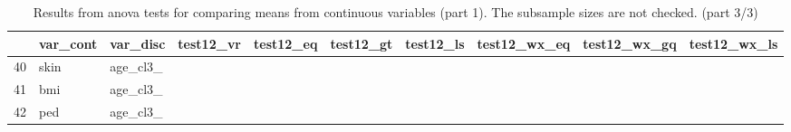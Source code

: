 \documentclass[12pt]{article}
\begin{document}
\begin{landscape}
\newpage
\begin{table}[ht]
\centering
\begin{tabular}{rlllllllll}
  \hline
 & var\_cont & var\_disc & test12\_vr & test12\_eq & test12\_gt & test12\_ls & test12\_wx\_eq & test12\_wx\_gq & test12\_wx\_ls \\ 
  \hline
40 & skin & age\_cl3\_ &   &   &   &   &   &   &   \\ 
  41 & bmi & age\_cl3\_ &   &   &   &   &   &   &   \\ 
  42 & ped & age\_cl3\_ &   &   &   &   &   &   &   \\ 
   \hline
\end{tabular}
\caption{Results from anova tests for comparing means from continuous variables (part 1). The subsample sizes are not checked. (part 3/3)} 
\label{tab:anova.test1.3}
\end{table}
 

\end{landscape}
\end{document}

